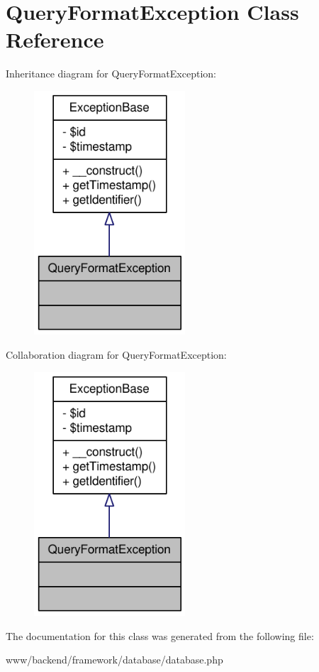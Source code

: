 \hypertarget{classQueryFormatException}{
\section{QueryFormatException Class Reference}
\label{classQueryFormatException}
}


Inheritance diagram for QueryFormatException:\nopagebreak
\begin{figure}[H]
\begin{center}
\leavevmode
\includegraphics[width=160pt]{classQueryFormatException__inherit__graph}
\end{center}
\end{figure}


Collaboration diagram for QueryFormatException:\nopagebreak
\begin{figure}[H]
\begin{center}
\leavevmode
\includegraphics[width=160pt]{classQueryFormatException__coll__graph}
\end{center}
\end{figure}


The documentation for this class was generated from the following file:\begin{DoxyCompactItemize}
\item 
www/backend/framework/database/database.php\end{DoxyCompactItemize}
